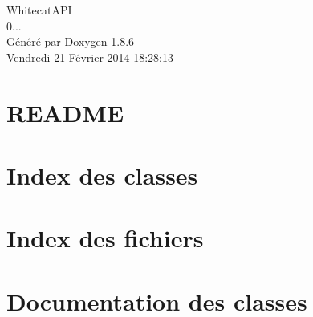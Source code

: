 \documentclass[twoside]{book}
\newcommand{\clearemptydoublepage}{%
  \newpage{\pagestyle{empty}\cleardoublepage}%
}
\begin{document}
\hypersetup{pageanchor=false}
\begin{titlepage}
\vspace*{7cm}
\begin{center}%
{\Large Whitecat\-A\-P\-I \\[1ex]\large 0... }\\
\vspace*{1cm}
{\large Généré par Doxygen 1.8.6}\\
\vspace*{0.5cm}
{\small Vendredi 21 Février 2014 18:28:13}\\
\end{center}
\end{titlepage}
\clearemptydoublepage
\tableofcontents
\clearemptydoublepage
{}
\hypersetup{pageanchor=true}

\chapter{R\-E\-A\-D\-M\-E}
\label{md__r_e_a_d_m_e}
\hypertarget{md__r_e_a_d_m_e}{}

\chapter{Index des classes}

\chapter{Index des fichiers}

\chapter{Documentation des classes}





\end{document}
